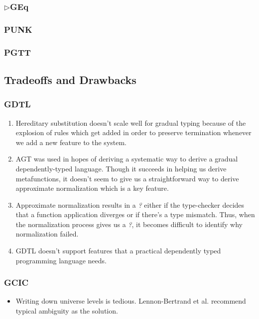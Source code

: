\documentclass{article}
\newcommand{\Gcode}[1]{{\color{OliveGreen}\textit{#1}}}
\newcommand{\GGEq}[0]{\(\triangleright\)GEq}
\begin{document}
\subsubsection{\GGEq{}}
\subsubsection{PUNK}
\subsubsection{PGTT}

\subsection{Tradeoffs and Drawbacks}\label{subsec:tradeoffs_drawbacks}
\subsubsection{GDTL}
\begin{enumerate}
  \item Hereditary substitution doesn't scale well for gradual typing because of
    the explosion of rules which get added in order to preserve termination
    whenever we add a new feature to the system.
  \item AGT was used in hopes of deriving a systematic way to derive a gradual
    dependently-typed language. Though it succeeds in helping us derive
    metafunctions, it doesn't seem to give us a straightforward way to derive
    approximate normalization which is a key feature.
  \item Approximate normalization results in a \Gcode{?} either if the
    type-checker decides that a function application diverges or if there's a
    type mismatch. Thus, when the normalization process gives us a \Gcode{?}, it
    becomes difficult to identify why normalization failed.
  \item GDTL doesn't support features that a practical dependently typed
    programming language needs.
\end{enumerate}
\subsubsection{GCIC}
\begin{itemize}
  \item Writing down universe levels is tedious. Lennon-Bertrand et al.
    recommend typical ambiguity \cite{harper_type_1991} as the solution.
\end{itemize}
\end{document}
